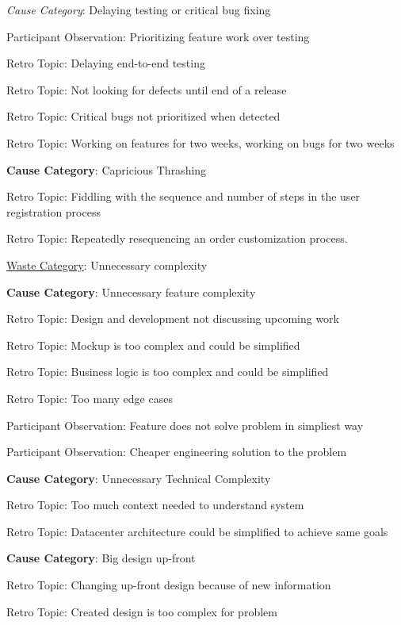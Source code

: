 \quad \textit{Cause Category}: Delaying testing or critical bug fixing

\quad \quad Participant Observation: Prioritizing feature work over testing

\quad \quad Retro Topic: Delaying end-to-end testing

\quad \quad Retro Topic: Not looking for defects until end of a release

\quad \quad Retro Topic: Critical bugs not prioritized when detected

\quad \quad Retro Topic: Working on features for two weeks, working on bugs for two weeks

\quad \textbf{Cause Category}: Capricious Thrashing

\quad \quad Retro Topic: Fiddling with the sequence and number of steps in the user registration process

\quad \quad Retro Topic: Repeatedly resequencing an order customization process.




\underline{Waste Category}: Unnecessary complexity

\quad \textbf{Cause Category}: Unnecessary feature complexity

\quad \quad Retro Topic: Design and development not discussing upcoming work

\quad \quad Retro Topic: Mockup is too complex and could be simplified

\quad \quad Retro Topic: Business logic is too complex and could be simplified

\quad \quad Retro Topic: Too many edge cases

\quad \quad Participant Observation: Feature does not solve problem in simpliest way

\quad \quad Participant Observation: Cheaper engineering solution to the  problem

\quad \textbf{Cause Category}: Unnecessary Technical Complexity

\quad \quad Retro Topic: Too much context needed to understand system

\quad \quad Retro Topic: Datacenter architecture could be simplified to achieve same goals

\quad \textbf{Cause Category}: Big design up-front

\quad \quad Retro Topic: Changing up-front design because of new information

\quad \quad Retro Topic: Created design is too complex for problem

